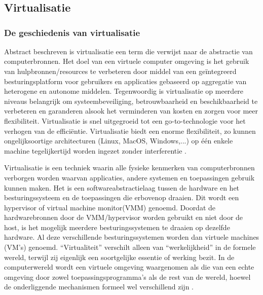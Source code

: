 \chapter{}
\label{ch:stand-van-zaken}

\section{Virtualisatie}
\subsection{De geschiedenis van virtualisatie}

Abstract beschreven is virtualisatie een term die verwijst naar de abstractie van computerbronnen. Het doel van een virtuele computer omgeving is het gebruik van hulpbronnen/resources te verbeteren door middel van een geïntegreerd besturingsplatform voor gebruikers en applicaties gebaseerd op aggregatie van heterogene en autonome middelen. Tegenwoordig is virtualisatie op meerdere niveaus belangrijk om systeembeveiliging, betrouwbaarheid en beschikbaarheid te verbeteren en garanderen alsook het verminderen van kosten en zorgen voor meer flexibiliteit. Virtualisatie is snel uitgegroeid tot een go-to-technologie voor het verhogen van de efficiëntie. Virtualisatie biedt een enorme flexibiliteit, zo kunnen ongelijksoortige architecturen (Linux, MacOS, Windows,...) op één enkele machine tegelijkertijd worden ingezet zonder interferentie \autocite{Radhwan2013}.

Virtualisatie is een techniek waarin alle fysieke kenmerken van computerbronnen verborgen worden waarvan applicaties, andere systemen en toepassingen gebruik kunnen maken. Het is een softwareabstractielaag tussen de hardware en het besturingssysteem en de toepassingen die erbovenop draaien. Dit wordt een hypervisor of virtual machine monitor(VMM) genoemd. Doordat de hardwarebronnen door de VMM/hypervisor worden gebruikt en niet door de host, is het mogelijk meerdere besturingssystemen te draaien op dezelfde hardware. Al deze verschillende besturingssystemen worden dan virtuele machines (VM's) genoemd. “Virtualiteit” verschilt alleen van “werkelijkheid” in de formele wereld, terwijl zij eigenlijk een soortgelijke essentie of werking bezit. In de computerwereld wordt een virtuele omgeving waargenomen als die van een echte omgeving door zowel toepassingsprogramma's als de rest van de wereld, hoewel de onderliggende mechanismen formeel wel verschillend zijn \autocite{Radhwan2013}.

